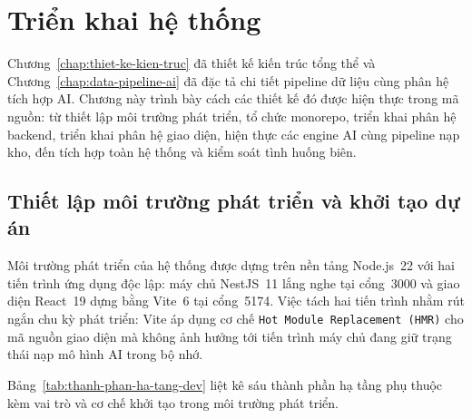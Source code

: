 
\chapter{Triển khai hệ thống}
\label{chap:trien-khai-he-thong}

Chương~\ref{chap:thiet-ke-kien-truc} đã thiết kế kiến trúc tổng thể và Chương~\ref{chap:data-pipeline-ai} đã đặc tả chi tiết pipeline dữ liệu cùng phân hệ tích hợp AI. Chương này trình bày cách các thiết kế đó được hiện thực trong mã nguồn: từ thiết lập môi trường phát triển, tổ chức monorepo, triển khai phân hệ backend, triển khai phân hệ giao diện, hiện thực các engine AI cùng pipeline nạp kho, đến tích hợp toàn hệ thống và kiểm soát tình huống biên.

\section{Thiết lập môi trường phát triển và khởi tạo dự án}
\label{sec:thiet-lap-moi-truong}

Môi trường phát triển của hệ thống được dựng trên nền tảng Node.js~22 với hai tiến trình ứng dụng độc lập: máy chủ NestJS~11 lắng nghe tại cổng~3000 và giao diện React~19 dựng bằng Vite~6 tại cổng~5174. Việc tách hai tiến trình nhằm rút ngắn chu kỳ phát triển: Vite áp dụng cơ chế \texttt{Hot Module Replacement (HMR)} cho mã nguồn giao diện mà không ảnh hưởng tới tiến trình máy chủ đang giữ trạng thái nạp mô hình AI trong bộ nhớ.

Bảng~\ref{tab:thanh-phan-ha-tang-dev} liệt kê sáu thành phần hạ tầng phụ thuộc kèm vai trò và cơ chế khởi tạo trong môi trường phát triển.

